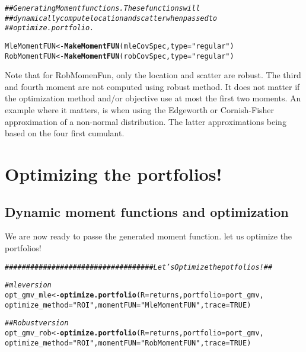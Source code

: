 \documentclass[12pt,letterpaper,english]{article}\usepackage[]{graphicx}\usepackage[]{color}
\makeatletter
\newcommand{\hlnum}[1]{\textcolor[rgb]{0.686,0.059,0.569}{#1}}%
\newcommand{\hlstr}[1]{\textcolor[rgb]{0.192,0.494,0.8}{#1}}%
\newcommand{\hlcom}[1]{\textcolor[rgb]{0.678,0.584,0.686}{\textit{#1}}}%
\newcommand{\hlstd}[1]{\textcolor[rgb]{0.345,0.345,0.345}{#1}}%
\newcommand{\hlkwb}[1]{\textcolor[rgb]{0.69,0.353,0.396}{#1}}%
\newcommand{\hlkwc}[1]{\textcolor[rgb]{0.333,0.667,0.333}{#1}}%
\newcommand{\hlkwd}[1]{\textcolor[rgb]{0.737,0.353,0.396}{\textbf{#1}}}%
\newenvironment{kframe}{%
 \def\at@end@of@kframe{}%
 \ifinner\ifhmode%
  \def\at@end@of@kframe{\end{minipage}}%
  \begin{minipage}{\columnwidth}%
 \fi\fi%
 \def\FrameCommand##1{\hskip\@totalleftmargin \hskip-\fboxsep
 \colorbox{shadecolor}{##1}\hskip-\fboxsep
     \hskip-\linewidth \hskip-\@totalleftmargin \hskip\columnwidth}%
 \MakeFramed {\advance\hsize-\width
   \@totalleftmargin\z@ \linewidth\hsize
   \@setminipage}}%
 {\par\unskip\endMakeFramed%
 \at@end@of@kframe}
\newenvironment{knitrout}{}{} %
\makeatother
\begin{document}
\begin{knitrout}
\color{fgcolor}\begin{kframe}
\begin{alltt}
\hlcom{## Generating Moment functions. These functions will}
\hlcom{## dynamically compute location and scatter when passed to}
\hlcom{## optimize.portfolio.}

\hlstd{MleMomentFUN} \hlkwb{<-} \hlkwd{MakeMomentFUN}\hlstd{(mleCovSpec,} \hlkwc{type} \hlstd{=} \hlstr{"regular"}\hlstd{)}
\hlstd{RobMomentFUN} \hlkwb{<-} \hlkwd{MakeMomentFUN}\hlstd{(robCovSpec,} \hlkwc{type} \hlstd{=} \hlstr{"regular"}\hlstd{)}
\end{alltt}
\end{kframe}
\end{knitrout}

Note that for RobMomenFun, only the location and scatter are robust. The third and fourth moment are not computed using robust method. It does not matter if the optimization method and/or objective use at most the first two moments.
An example where it matters, is when using the Edgeworth or Cornish-Fisher approximation of a non-normal distribution. The latter approximations being based on the four first cumulant.

\section{Optimizing the portfolios!}
\subsection{Dynamic moment functions and optimization}
We are now ready to passe the generated moment function.
let us optimize the portfolios!
\begin{knitrout}
\color{fgcolor}\begin{kframe}
\begin{alltt}
\hlcom{################################### Let's Optimize the potfolios! ##}

\hlcom{# mle version}
\hlstd{opt_gmv_mle} \hlkwb{<-} \hlkwd{optimize.portfolio}\hlstd{(}\hlkwc{R} \hlstd{= returns,} \hlkwc{portfolio} \hlstd{= port_gmv,}
    \hlkwc{optimize_method} \hlstd{=} \hlstr{"ROI"}\hlstd{,} \hlkwc{momentFUN} \hlstd{=} \hlstr{"MleMomentFUN"}\hlstd{,} \hlkwc{trace} \hlstd{=} \hlnum{TRUE}\hlstd{)}

\hlcom{## Robust version}
\hlstd{opt_gmv_rob} \hlkwb{<-} \hlkwd{optimize.portfolio}\hlstd{(}\hlkwc{R} \hlstd{= returns,} \hlkwc{portfolio} \hlstd{= port_gmv,}
    \hlkwc{optimize_method} \hlstd{=} \hlstr{"ROI"}\hlstd{,} \hlkwc{momentFUN} \hlstd{=} \hlstr{"RobMomentFUN"}\hlstd{,} \hlkwc{trace} \hlstd{=} \hlnum{TRUE}\hlstd{)}
\end{alltt}
\end{kframe}
\end{knitrout}
\end{document}
